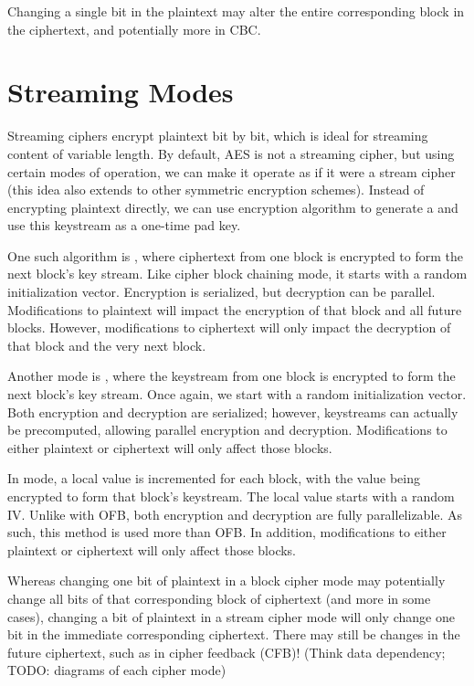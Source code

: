 \begin{notebox}
    Changing a single bit in the plaintext may alter the entire corresponding block in the ciphertext, and potentially more in CBC.
\end{notebox}

\section{Streaming Modes}
Streaming ciphers encrypt plaintext bit by bit, which is ideal for streaming content of variable length. By default, AES is not a streaming cipher, but using certain modes of operation, we can make it operate as if it were a stream cipher (this idea also extends to other symmetric encryption schemes). Instead of encrypting plaintext directly, we can use encryption algorithm to generate a  and use this keystream as a one-time pad key.

One such algorithm is , where ciphertext from one block is encrypted to form the next block's key stream. Like cipher block chaining mode, it starts with a random initialization vector. Encryption is serialized, but decryption can be parallel. Modifications to plaintext will impact the encryption of that block and all future blocks. However, modifications to ciphertext will only impact the decryption of that block and the very next block.

Another mode is , where the keystream from one block is encrypted to form the next block's key stream. Once again, we start with a random initialization vector. Both encryption and decryption are serialized; however, keystreams can actually be precomputed, allowing parallel encryption and decryption. Modifications to either plaintext or ciphertext will only affect those blocks.

In  mode, a local value is incremented for each block, with the value being encrypted to form that block's keystream. The local value starts with a random IV. Unlike with OFB, both encryption and decryption are fully parallelizable. As such, this method is used more than OFB. In addition, modifications to either plaintext or ciphertext will only affect those blocks.

\begin{notebox}
    Whereas changing one bit of plaintext in a block cipher mode may potentially change all bits of that corresponding block of ciphertext (and more in some cases), changing a bit of plaintext in a stream cipher mode will only change one bit in the immediate corresponding ciphertext. There may still be changes in the future ciphertext, such as in cipher feedback (CFB)! (Think data dependency; TODO: diagrams of each cipher mode)
\end{notebox}

